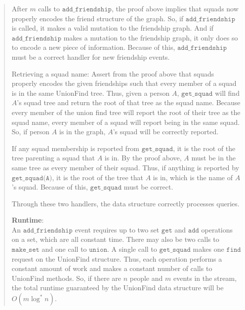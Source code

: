 \documentclass[11pt]{article}
\newcommand{\code}[1]{$\texttt{#1}$}
\begin{document}
\begin{enumerate}
\begin{enumerate}
\begin{quote}
After $m$ calls to \code{add\_friendship}, the proof above implies that squads now properly encodes the friend structure of the graph. So, if \code{add\_friendship} is called, it makes a valid mutation to the friendship graph. And if \code{add\_friendship} makes a mutation to the friendship graph, it only does so to encode a new piece of information. Because of this, \code{add\_friendship} must be a correct handler for new friendship events.

\medskip
Retrieving a squad name: Assert from the proof above that squads properly encodes the given friendships such that every member of a squad is in the same UnionFind tree. Thus, given a person $A$, \code{get\_squad} will find $A$'s squad tree and return the root of that tree as the squad name. Because every member of the union find tree will report the root of their tree as the squad name, every member of a squad will report being in the same squad. So, if person $A$ is in the graph, $A$'s squad will be correctly reported. 

\medskip
If any squad membership is reported from \code{get\_squad}, it is the root of the tree parenting a squad that $A$ is in. By the proof above, $A$ must be in the same tree as every member of their squad. Thus, if anything is reported by \code{get\_squad(A)}, it is the root of the tree that $A$ is in, which is the name of $A$'s squad. Because of this, \code{get\_squad} must be correct.

\medskip
Through these two handlers, the data structure correctly processes queries.

\medskip 
\textbf{Runtime}: \\ 
An \code{add\_friendship} event requires up to two set \code{get} and \code{add} operations on a set, which are all constant time. There may also be two calls to \code{make\_set} and one call to \code{union}. A single call to \code{get\_squad} makes one \code{find} request on the UnionFind structure. Thus, each operation performs a constant amount of work and makes a constant number of calls to UnionFind methods. So, if there are $n$ people and $m$ events in the stream, the total runtime guaranteed by the UnionFind data structure will be $O(m \log^*n)$.
      

\end{quote}
\end{enumerate}
\end{enumerate}
\end{document}
